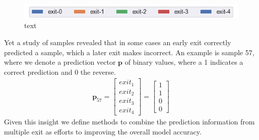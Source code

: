 \begin{figure}
	\captionsetup[subfigure]{justification=centering}
	\centering
	\includegraphics[width=.7\linewidth]{figures/edge/exit0-4_legend}
	\hfill
	\hfill
	\caption[short text]{text}
	\label{fig:exit-highscore}
\end{figure}

Yet a study of samples revealed that in some cases an early exit correctly predicted a sample, which a later exit makes incorrect. An example is sample 57, where we denote a prediction vector $\mathbf{p}$ of binary values, where a 1 indicates a correct prediction and 0 the reverse. 
\begin{align*}
\mathbf{p}_{57}=
\begin{bmatrix}
exit_1 \\
exit_2 \\
exit_3 \\
exit_4
\end{bmatrix}
=
\begin{bmatrix}
1 \\
1 \\
0 \\
0
\end{bmatrix}
\end{align*}
Given this insight we define methods to combine the prediction information from multiple exit as efforts to improving the overall model accuracy. 

